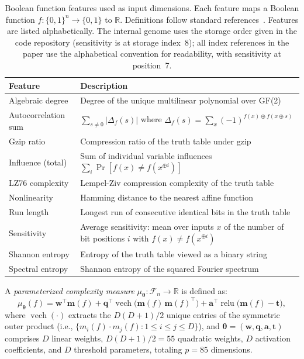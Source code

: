 \documentclass[twoside,11pt]{article}
\newcommand{\R}{\mathbb{R}}
\newcommand{\btheta}{\boldsymbol{\theta}}
\newcommand{\calF}{\mathcal{F}}
\begin{document}
\begin{table}[t]
\caption{Boolean function features used as input dimensions. Each feature
maps a Boolean function $f : \{0,1\}^n \to \{0,1\}$ to $\R$. Definitions
follow standard references~\citep{boppana1990complexity,jukna2012boolean}.
Features are listed alphabetically.
The internal genome uses the storage order given in the code repository
(sensitivity is at storage index~8); all index references in the paper use
the alphabetical convention for readability, with sensitivity at
position~7.}
\label{tab:features}
\centering
\small
\begin{tabular}{lp{8cm}}
\toprule
Feature & Description \\
\midrule
Algebraic degree & Degree of the unique multilinear polynomial over GF(2) \\
Autocorrelation sum & $\sum_{s \neq 0} |\Delta_f(s)|$ where $\Delta_f(s) = \sum_x (-1)^{f(x) \oplus f(x \oplus s)}$ \\
Gzip ratio & Compression ratio of the truth table under gzip \\
Influence (total) & Sum of individual variable influences $\sum_i \Pr[f(x) \neq f(x^{\oplus i})]$ \\
LZ76 complexity & Lempel-Ziv compression complexity of the truth table \\
Nonlinearity & Hamming distance to the nearest affine function \\
Run length & Longest run of consecutive identical bits in the truth table \\
Sensitivity & Average sensitivity: mean over inputs $x$ of the number of bit positions $i$ with $f(x) \neq f(x^{\oplus i})$ \\
Shannon entropy & Entropy of the truth table viewed as a binary string \\
Spectral entropy & Shannon entropy of the squared Fourier spectrum \\
\bottomrule
\end{tabular}
\end{table}

A \emph{parameterized complexity measure} $\mu_\btheta : \calF_n \to \R$ is defined as:
\begin{equation}
\label{eq:measure}
\mu_\btheta(f) = \mathbf{w}^\top \mathbf{m}(f)
  + \mathbf{q}^\top \operatorname{vech}\bigl(\mathbf{m}(f)\,\mathbf{m}(f)^\top\bigr)
  + \mathbf{a}^\top \operatorname{relu}\bigl(\mathbf{m}(f) - \mathbf{t}\bigr),
\end{equation}
where $\operatorname{vech}(\cdot)$ extracts the $D(D+1)/2$ unique entries of the
symmetric outer product (i.e., $\{m_i(f) \cdot m_j(f) : 1 \leq i \leq j \leq D\}$), and $\btheta = (\mathbf{w}, \mathbf{q}, \mathbf{a}, \mathbf{t})$
comprises $D$ linear weights, $D(D+1)/2 = 55$ quadratic weights, $D$ activation
coefficients, and $D$ threshold parameters, totaling $p = 85$ dimensions.
\end{document}
